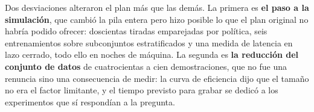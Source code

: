 Dos desviaciones alteraron el plan más que las demás. La primera es \textbf{el paso a la
simulación}, que cambió la pila entera pero hizo posible lo que el plan original no habría podido
ofrecer: doscientas tiradas emparejadas por política, seis entrenamientos sobre subconjuntos
estratificados y una medida de latencia en lazo cerrado, todo ello en noches de máquina. La segunda
es \textbf{la reducción del conjunto de datos} de cuatrocientas a cien demostraciones, que no fue
una renuncia sino una consecuencia de medir: la curva de eficiencia dijo que el tamaño no era el
factor limitante, y el tiempo previsto para grabar se dedicó a los experimentos que sí respondían a
la pregunta.
